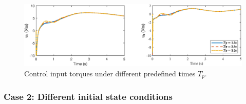 \documentclass[pdflatex,sn-mathphys-num]{sn-jnl}%
\theoremstyle{thmstyleone}%
\theoremstyle{thmstyletwo}%
\theoremstyle{thmstylethree}%
\begin{document}
\begin{figure}[H]
	\centering
	\includegraphics[width=0.9\linewidth]{fig5.eps}
	\caption{Control input torques under different predefined times \(T_p\).}
	\label{fig:5}
\end{figure}


\subsubsection*{Case 2: Different initial state conditions}


\end{document}
